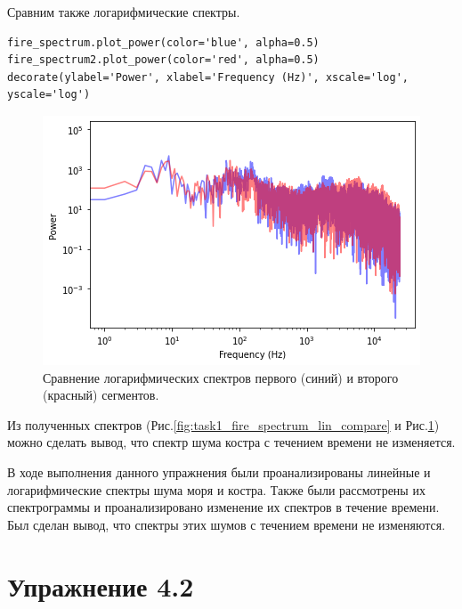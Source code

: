 \documentclass[a4paper, 14pt]{extarticle}
\begin{document}
    Сравним также логарифмические спектры.

    \begin{lstlisting}[caption= Сравнение логарифмических спектров двух сегментов., label={lst:task1_fire_spectrum_log_compare}]
fire_spectrum.plot_power(color='blue', alpha=0.5)
fire_spectrum2.plot_power(color='red', alpha=0.5)
decorate(ylabel='Power', xlabel='Frequency (Hz)', xscale='log', yscale='log')   \end{lstlisting}

    \begin{figure}[H]
        \centering
        \includegraphics[width=0.8\linewidth]{resources/Images/task1_fire_spectrum_log_compare}
        \caption{Сравнение логарифмических спектров первого (синий) и второго (красный) сегментов.}
        \label{fig:task1_fire_spectrum_log_compare}
    \end{figure}

    Из полученных спектров (Рис.\ref{fig:task1_fire_spectrum_lin_compare} и Рис.\ref{fig:task1_fire_spectrum_log_compare})
    можно сделать вывод, что спектр шума костра с течением времени не изменяется.

    В ходе выполнения данного упражнения были проанализированы линейные и логарифмические спектры шума моря и костра.
    Также были рассмотрены их спектрограммы и проанализировано изменение их спектров в течение времени.
    Был сделан вывод, что спектры этих шумов с течением времени не изменяются.

    \newpage

    \section{Упражнение 4.2}
    \label{sec:task2}
\end{document}
